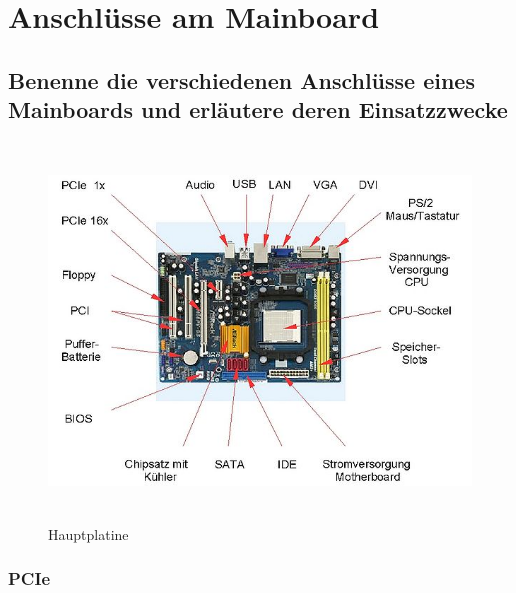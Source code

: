 \documentclass[a4paper]{article}
\begin{document}
    \section{Anschlüsse am Mainboard}\label{sec:anschlüsse-am-mainboard}
    \subsection{\color{red} Benenne die verschiedenen Anschlüsse eines Mainboards und erläutere deren Einsatzzwecke}\label{subsec:benenne-und-erläuter-den-einsatzzwecke-von-der-verschiedenen-anschlüsse-eines-mainboards}
    \begin{center}
        \begin{figure}[H]
            \centering
            \includegraphics[height=10cm]{media/Motherboard}
            \captionsetup{labelformat=empty}
            \caption{Hauptplatine}
            \label{fig:Motherboard}
        \end{figure}
    \end{center}
    \subsubsection{\color{codegreen}PCIe}
\end{document}
